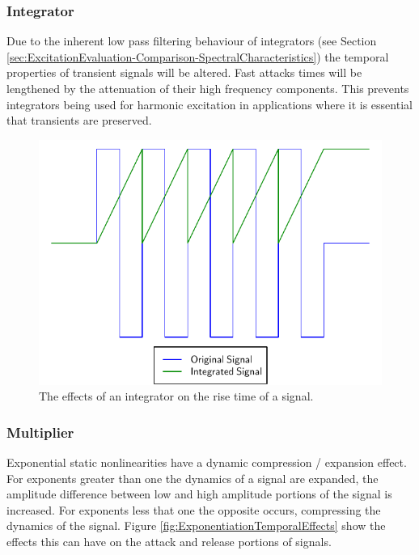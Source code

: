 		\subsubsection*{Integrator}
			Due to the inherent low pass filtering behaviour of integrators (see Section
			\ref{sec:ExcitationEvaluation-Comparison-SpectralCharacteristics}) the temporal properties of
			transient signals will be altered. Fast attacks times will be lengthened by the attenuation of
			their high frequency components. This prevents integrators being used for harmonic excitation in
			applications where it is essential that transients are preserved. 

			\begin{figure}[h!]
				\centering
				\includegraphics{chapter5/Images/IntegratorTemporalEffects.pdf}
				\caption{The effects of an integrator on the rise time of a signal.}
				\label{fig:IntegratorTemporalEffects}
			\end{figure}
			
		\subsubsection*{Multiplier}
			Exponential static nonlinearities have a dynamic compression / expansion effect. For exponents
			greater than one the dynamics of a signal are expanded, the amplitude difference between low and
			high amplitude portions of the signal is increased. For exponents less that one the opposite
			occurs, compressing the dynamics of the signal. Figure \ref{fig:ExponentiationTemporalEffects} show
			the effects this can have on the attack and release portions of signals.

